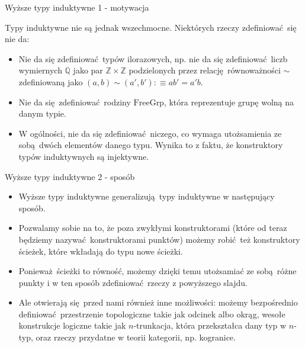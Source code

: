 \documentclass{beamer}
\newcommand{\defn}{:\equiv}
\begin{document}
\begin{frame}{Wyższe typy induktywne 1 - motywacja}

Typy induktywne nie są jednak wszechmocne. Niektórych rzeczy zdefiniować się nie da:
\begin{itemize}
	\item Nie da się zdefiniować typów ilorazowych, np. nie da się zdefiniować liczb wymiernych $\mathbb{Q}$ jako par $\mathbb{Z} \times \mathbb{Z}$ podzielonych przez relację równoważności $\sim$ zdefiniowaną jako $(a, b) \sim (a', b') \defn ab' = a'b$.
	\item Nie da się zdefiniować rodziny $\text{FreeGrp}$, która reprezentuje grupę wolną na danym typie.
	\item W ogólności, nie da się zdefiniować niczego, co wymaga utożsamienia ze sobą dwóch elementów danego typu. Wynika to z faktu, że konstruktory typów induktywnych są injektywne.
\end{itemize}
\end{frame}

\begin{frame}{Wyższe typy induktywne 2 - sposób}
\begin{itemize}
	\item Wyższe typy induktywne generalizują typy induktywne w następujący sposób.
	\item Pozwalamy sobie na to, że poza zwykłymi konstruktorami (które od teraz będziemy nazywać konstruktorami punktów) możemy robić też konstruktory ścieżek, które wkładają do typu nowe ścieżki.
	\item Ponieważ ścieżki to równość, możemy dzięki temu utożsamiać ze sobą różne punkty i w ten sposób zdefiniować rzeczy z powyższego slajdu.
	\item Ale otwierają się przed nami również inne możliwości: możemy bezpośrednio definiować przestrzenie topologiczne takie jak odcinek albo okrąg, wesołe konstrukcje logiczne takie jak $n$-trunkacja, która przekształca dany typ w $n$-typ, oraz rzeczy przydatne w teorii kategorii, np. kogranice.
\end{itemize}
\end{frame}
\end{document}
